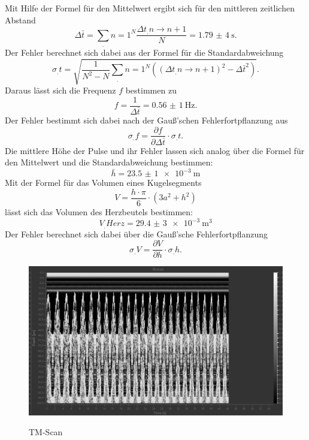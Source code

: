 \noindent Mit Hilfe der Formel für den Mittelwert ergibt sich für den mittleren zeitlichen Abstand
\[
\Delta\bar{t}= \sum_.{n=1}^N \frac{\Delta t_.{n\rightarrow n+1}}{N} = \SI{1,79(4)}{\second} \text{.}
\]
Der Fehler berechnet sich dabei aus der Formel für die Standardabweichung
\[
\sigma_.t=\sqrt{\frac{1}{N^2-N}\sum_.n=1^N ((\Delta t_.{n\rightarrow n+1})^2-\Delta\bar{t}^2)} \text{.}
\]
Daraus lässt sich die Frequenz $f$ bestimmen zu
\[
f=\frac{1}{\Delta\bar{t}}= \SI{0,56(1)}{\hertz} \text{.}
\]
Der Fehler bestimmt sich dabei nach der Gauß'schen Fehlerfortpflanzung aus
\[
\sigma_.f=\frac{\partial f}{\partial \Delta\bar{t}}\cdot \sigma_.t \text{.}
\]
Die mittlere Höhe der Pulse und ihr Fehler lassen sich analog über die Formel für den Mittelwert und die Standardabweichung bestimmen:
\[
\bar{h}=\SI{23,5(1)e-3}{\metre}
\]
Mit der Formel für das Volumen eines Kugelsegments
\[
V=\frac{h\cdot\pi}{6}\cdot\left(3a^2+h^2\right)
\]
lässt sich das Volumen des Herzbeutels bestimmen:
\[
V_.{Herz}=\SI{29,4(3)e-3}{\cubic\metre}
\]
Der Fehler berechnet sich dabei über die Gauß'sche Fehlerfortpflanzung
\[
\sigma_.V=\frac{\partial V}{\partial h}\cdot\sigma_.h \text{.}
\]
\begin{figure}
	\centering
	\caption{TM-Scan}
	\includegraphics[width=\linewidth-40pt,height=\textheight-40pt,keepaspectratio]{content/images/TM-Scan.jpg}
	\label{fig:TM-Scan}
\end{figure}